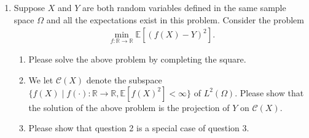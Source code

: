 \begin{exercise}
\begin{enumerate}
\begin{solution}
\begin{enumerate}
				\end{enumerate}
			\end{solution}

		\item Suppose $X$ and $Y$ are both random variables defined in the same sample space $\Omega$ and all the expectations exist in this problem. Consider the problem
			\begin{align*}
				\min_{f:\mathbb{R}\to\mathbb{R}}\mathbb{E}[(f(X)-Y)^2].
			\end{align*}
			\begin{enumerate}
				\item Please solve the above problem by completing the square.
				\item We let $\mathcal{C}(X)$ denote the subspace $\{f(X)\mid f(\cdot):\mathbb{R}\to\mathbb{R}, \mathbb{E}[f(X)^2]<\infty \}$ of $L^2(\Omega)$. Please show that the solution of the above problem is the projection of $Y$ on $\mathcal{C}(X)$.
				\item Please show that question 2 is a special case of question 3.
			\end{enumerate}


\end{enumerate}
\end{exercise}
